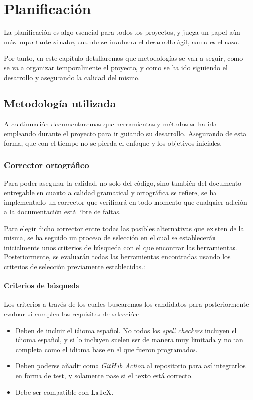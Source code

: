 \chapter{Planificación}

La planificación es algo esencial para todos los proyectos, y juega un papel aún 
más importante si cabe, cuando se involucra el desarrollo ágil, como es el caso. 

Por tanto, en este capítulo detallaremos que metodologías se van a seguir, como 
se va a organizar temporalmente el proyecto, y como se ha ido siguiendo el 
desarrollo y asegurando la calidad del mismo. 

\section{Metodología utilizada}

A continuación documentaremos que herramientas y métodos se ha ido empleando 
durante el proyecto para ir guiando su desarrollo. Asegurando de esta forma, que 
con el tiempo no se pierda el enfoque y los objetivos iniciales. 

\subsection{Corrector ortográfico}
Para poder asegurar la calidad, no solo del código, sino también del documento
entregable en cuanto a calidad gramatical y ortográfica se refiere, se ha
implementado un corrector que verificará en todo momento que cualquier adición a
la documentación está libre de faltas. 

Para elegir dicho corrector entre todas las posibles alternativas que existen de 
la misma, se ha seguido un proceso de selección en el cual se establecerán 
inicialmente unos criterios de búsqueda con el que encontrar las herramientas. 
Posteriormente, se evaluarán todas las herramientas encontradas usando los 
criterios de selección previamente establecidos.: 

\subsubsection{Criterios de búsqueda}

Los criterios a través de los cuales buscaremos los candidatos para
posteriormente evaluar si cumplen los requisitos de selección:
\begin{itemize}
    \item Deben de incluir el idioma español. No todos los \emph{spell checkers}
    incluyen el idioma español, y si lo incluyen suelen ser de manera muy
    limitada y no tan completa como el idioma base en el que fueron programados.
    \item Deben poderse añadir como \emph{GitHub Action} al repositorio para así
    integrarlos en forma de test, y solamente pase si el texto está correcto.
    \item Debe ser compatible con LaTeX.
\end{itemize}

